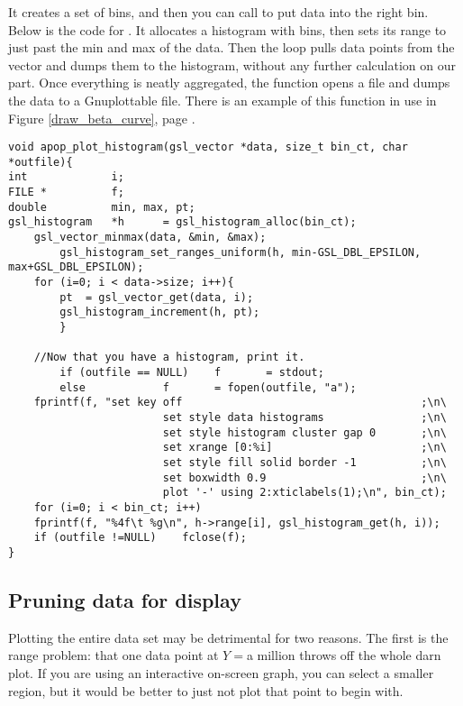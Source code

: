 It creates a set of bins, and
then you can call  to put
data into the right bin. Below is the code for . 
It allocates a histogram with
 bins, then sets its range to just past the min and max
of the data. Then the  loop pulls data points from the vector and
dumps them to the histogram, without any further calculation on our part.
Once everything is neatly aggregated, the function opens a file and dumps the data to a Gnuplottable file. There is an example of this function in use in Figure \ref{draw_beta_curve}, page \pageref{draw_beta_curve}.
\begin{lstlisting}
void apop_plot_histogram(gsl_vector *data, size_t bin_ct, char *outfile){
int             i;
FILE *          f;
double          min, max, pt;
gsl_histogram   *h      = gsl_histogram_alloc(bin_ct);
    gsl_vector_minmax(data, &min, &max);
        gsl_histogram_set_ranges_uniform(h, min-GSL_DBL_EPSILON, max+GSL_DBL_EPSILON);
    for (i=0; i < data->size; i++){
        pt  = gsl_vector_get(data, i);
        gsl_histogram_increment(h, pt);
        }

    //Now that you have a histogram, print it.
        if (outfile == NULL)    f       = stdout;
        else            f       = fopen(outfile, "a");
    fprintf(f, "set key off                                     ;\n\
                        set style data histograms               ;\n\
                        set style histogram cluster gap 0       ;\n\
                        set xrange [0:%i]                       ;\n\
                        set style fill solid border -1          ;\n\
                        set boxwidth 0.9                        ;\n\
                        plot '-' using 2:xticlabels(1);\n", bin_ct);
    for (i=0; i < bin_ct; i++)
    fprintf(f, "%4f\t %g\n", h->range[i], gsl_histogram_get(h, i));
    if (outfile !=NULL)    fclose(f);
}
\end{lstlisting}
\index{histograms!plotting|)}

\subsection {Pruning data for display}
Plotting the entire data set may be detrimental for two reasons. The
first is the range problem: that one data point at $Y=$a million throws off the
whole darn plot. If you are using an interactive on-screen graph, you
can select a smaller region, but it would be better to just not plot
that point to begin with. 

